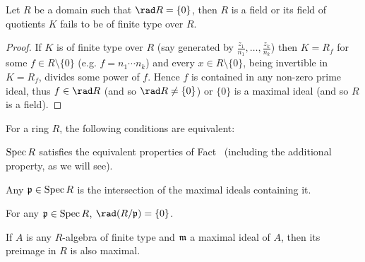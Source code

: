 \documentclass[a4paper,parskip=half,numbers=enddot, DIV=12]{scrreprt}
\begin{document}
\begin{lem}
    Let $R$ be a domain such that $\rad R = \{0\}$, then $R$ is a field or its field of quotients $K$ fails to be of finite type over $R$.
\end{lem}
\begin{proof}
    If $K$ is of finite type over $R$ (say generated by $\frac{z_1}{n_1},\ldots,\frac{z_k}{n_k}$) then $K= R_f$ for some $f\in R\setminus \{0\}$ (e.g. $f = n_1\cdots n_k$) and every $x\in R\setminus \{0\}$, being invertible in $K=R_f$, divides some power of $f$. Hence $f$ is contained in any non-zero prime ideal, thus $f\in\rad R$ (and so $\rad R\neq\{0\}$) or $\{0\}$ is a maximal ideal (and so $R$ is a field).
\end{proof}
\begin{prop}
    For a ring $R$, the following conditions are equivalent:
    \begin{alphanumerate}
    \item 
        $\operatorname{Spec} R$ satisfies the equivalent properties of Fact~ (including the additional property, as we will see).
    \item  
        Any $\mathfrak{p}\in \operatorname{Spec} R$ is the intersection of the maximal ideals containing it.
    \item 
        For any $\mathfrak{p}\in \operatorname{Spec} R$, $\rad(R/\pp) = \{0\}$.
    \item  
        If $A$ is any $R$-algebra of finite type and $\mathfrak{m}$ a maximal ideal of $A$, then its preimage in $R$ is also maximal.
    \end{alphanumerate}
\end{prop}
\end{document}
